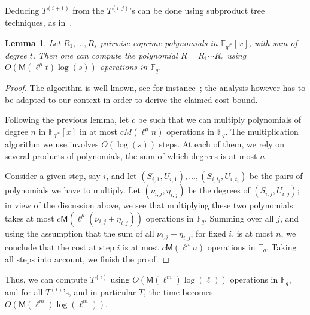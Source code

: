 \documentclass{lms}
\newcommand{\todo}[1]{{\color{red}TODO: #1}}
\newtheorem{lem}[thm]{Lemma}
\newcommand{\F}{\mathbb{F}}
\begin{document}
Deducing $T^{(i+1)}$ from the $T^{(i,j)}$'s can be done using
subproduct tree techniques, as in~\cite[Chapter~10]{vzGG}. 



\begin{lem} \label{lemma:mul-pol}
  Let $R_1,\dots,R_s$ pairwise coprime polynomials in
  $\F_{q^{\ell^\mu}}[x]$, with sum of degree $t$. Then one can compute the
  polynomial $R=R_1 \cdots R_s$
  using $O(\mathsf{M}(\ell^\mu t) \log(s) )$ operations in $\F_q$.
\end{lem}
\begin{proof}
  The algorithm is well-known, see for
  instance~\cite[Lemma~10.4]{vzGG}; the analysis however has to be
  adapted to our context in order to derive the claimed cost bound.

  Following the previous lemma, let $c$ be such that we can multiply
  polynomials of degree $n$ in $\mathbb{F}_{q^{\ell^\mu}}[x] $ in at
  most $c M(\ell^\mu n)$ operations in $\F_q$. The multiplication
  algorithm we use involves $O(\log(s))$ steps. At each of them, we
  rely on several products of polynomials, the sum of which degrees is
  at most $n$.
  
  Consider a given step, say $i$, and let
  $(S_{i,1},U_{i,1}),\dots,(S_{i,t_i},U_{i,t_i})$ be the pairs of
  polynomials we have to multiply. Let $(\nu_{i,j},\eta_{i,j})$ be the
  degrees of $(S_{i,j},U_{i,j})$; in view of the discussion above, we
  see that multiplying these two polynomials takes at most $c
  \mathsf{M}(\ell^\mu (\nu_{i,j}+\eta_{i,j}))$ operations in
  $\F_q$. Summing over all $j$, and using the assumption that the sum
  of all $\nu_{i,j}+\eta_{i,j}$, for fixed $i$, is at most $n$, we
  conclude that the cost at step $i$ is at most $c \mathsf{M}(\ell^\mu
  n)$ operations in $\F_q$. Taking all steps into account, we finish
  the proof.
\end{proof}

Thus, we can compute $T^{(i)}$ using $O(\mathsf{M}(\ell^m)\log(\ell))$
operations in $\F_q$, and for all $T^{(i)}$'s, and in particular $T$,
the time becomes $O(\mathsf{M}(\ell^m)\log(\ell^m))$.
\end{document}

